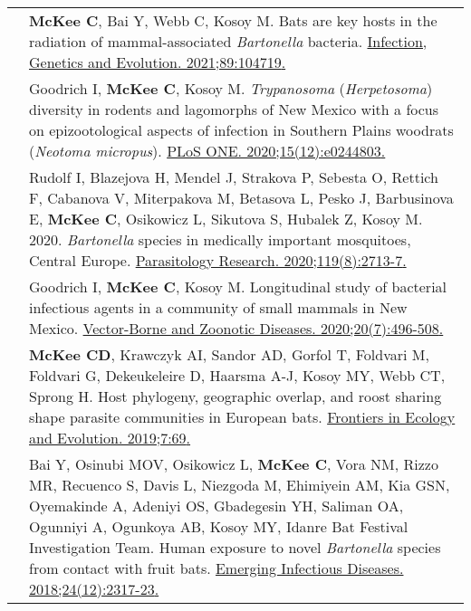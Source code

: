 \documentclass[letterpaper]{deedy-resume} %
\begin{document}
\begin{tabular}{>{\raggedright\arraybackslash}p{2cm}p{16cm}}
2021 & \textbf{McKee C}, Bai Y, Webb C, Kosoy M. Bats are key hosts in the radiation of mammal-associated \textit{Bartonella} bacteria. \href{https://doi.org/10.1016/j.meegid.2021.104719}{\textcolor{special}{Infection, Genetics and Evolution. 2021;89:104719}.} \\

2020 & Goodrich I, \textbf{McKee C}, Kosoy M. \textit{Trypanosoma} (\textit{Herpetosoma}) diversity in rodents and lagomorphs of New Mexico with a focus on epizootological aspects of infection in Southern Plains woodrats (\textit{Neotoma micropus}). \href{https://dx.plos.org/10.1371/journal.pone.0244803}{\textcolor{special}{PLoS ONE. 2020;15(12):e0244803}.} \\

2020 & Rudolf I, Blazejova H, Mendel J, Strakova P, Sebesta O, Rettich F, Cabanova V, Miterpakova M, Betasova L, Pesko J, Barbusinova E, \textbf{McKee C}, Osikowicz L, Sikutova S, Hubalek Z, Kosoy M. 2020. \textit{Bartonella} species in medically important mosquitoes, Central Europe. \href{https://doi.org/10.1007/s00436-020-06732-1}{\textcolor{special}{Parasitology Research. 2020;119(8):2713-7}.} \\

2020 & Goodrich I, \textbf{McKee C}, Kosoy M. Longitudinal study of bacterial infectious agents in a community of small mammals in New Mexico. \href{https://doi.org/10.1089/vbz.2019.2550}{\textcolor{special}{Vector-Borne and Zoonotic Diseases. 2020;20(7):496-508}.} \\

2019 & \textbf{McKee CD}, Krawczyk AI, Sandor AD, Gorfol T, Foldvari M, Foldvari G, Dekeukeleire D, Haarsma A-J, Kosoy MY, Webb CT, Sprong H. Host phylogeny, geographic overlap, and roost sharing shape parasite communities in European bats. \href{https://doi.org/10.3389/fevo.2019.00069}{\textcolor{special}{Frontiers in Ecology and Evolution. 2019;7:69}.} \\

2018 & Bai Y, Osinubi MOV, Osikowicz L, \textbf{McKee C}, Vora NM, Rizzo MR, Recuenco S, Davis L, Niezgoda M, Ehimiyein AM, Kia GSN, Oyemakinde A, Adeniyi OS, Gbadegesin YH, Saliman OA, Ogunniyi A, Ogunkoya AB, Kosoy MY, Idanre Bat Festival Investigation Team. Human exposure to novel \textit{Bartonella} species from contact with fruit bats. \href{https://doi.org/10.3201/eid2412.181204}{\textcolor{special}{Emerging Infectious Diseases. 2018;24(12):2317-23}.} \\


\end{tabular}
\end{document}

